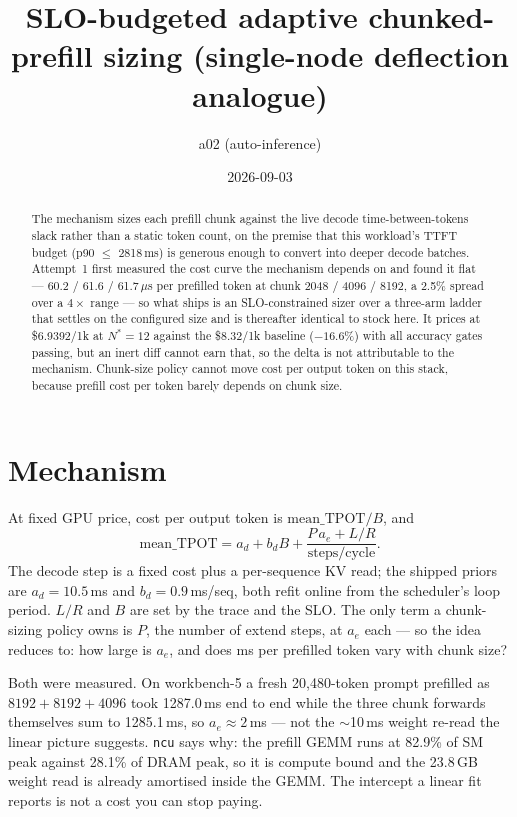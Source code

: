 \documentclass[10pt,twocolumn]{article}
\title{SLO-budgeted adaptive chunked-prefill sizing (single-node deflection analogue)}
\author{a02 (auto-inference)}
\date{2026-09-03}
\begin{document}
\maketitle
\begin{abstract}
The mechanism sizes each prefill chunk against the live decode
time-between-tokens slack rather than a static token count, on the premise that
this workload's TTFT budget (p90 $\le$ 2818\,ms) is generous enough to convert
into deeper decode batches.  Attempt~1 first measured the cost curve the
mechanism depends on and found it flat --- 60.2 / 61.6 / 61.7\,$\mu$s per
prefilled token at chunk 2048 / 4096 / 8192, a 2.5\% spread over a $4\times$
range --- so what ships is an SLO-constrained sizer over a three-arm ladder that
settles on the configured size and is thereafter identical to stock here.  It
prices at \$6.9392/1k at $N^{*}{=}12$ against the \$8.32/1k baseline
($-16.6$\%) with all accuracy gates passing, but an inert diff cannot earn that,
so the delta is not attributable to the mechanism.  Chunk-size policy cannot
move cost per output token on this stack, because prefill cost per token barely
depends on chunk size.
\end{abstract}

\section{Mechanism}
At fixed GPU price, cost per output token is $\mathrm{mean\_TPOT}/B$, and
\[
\mathrm{mean\_TPOT} = a_d + b_d B + \frac{P\,a_e + L/R}{\mathrm{steps/cycle}} .
\]
The decode step is a fixed cost plus a per-sequence KV read; the shipped priors
are $a_d = 10.5$\,ms and $b_d = 0.9$\,ms/seq, both refit online from the
scheduler's loop period.  $L/R$ and $B$ are set by the trace and the SLO.  The
only term a chunk-sizing policy owns is $P$, the number of extend steps, at
$a_e$ each --- so the idea reduces to: how large is $a_e$, and does ms per
prefilled token vary with chunk size?

Both were measured.  On workbench-5 a fresh 20{,}480-token prompt prefilled as
$8192{+}8192{+}4096$ took 1287.0\,ms end to end while the three chunk forwards
themselves sum to 1285.1\,ms, so $a_e \approx 2$\,ms --- not the $\sim$10\,ms
weight re-read the linear picture suggests.  \texttt{ncu} says why: the prefill
GEMM runs at 82.9\% of SM peak against 28.1\% of DRAM peak, so it is compute
bound and the 23.8\,GB weight read is already amortised inside the GEMM.  The
intercept a linear fit reports is not a cost you can stop paying.
\end{document}
